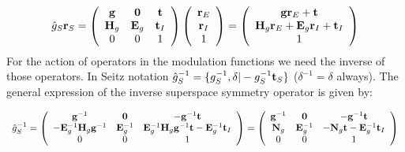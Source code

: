 \documentclass[10pt]{article}
\begin{document}
\begin{equation} \label{action_aug}
\begin{array} {l}
{\hat g}_S {\bf r}_S= \left( {\begin{array}{*{20}{c}}
	{\bf g}    &{\bf 0}    &{\bf t}\\
	{{\bf H}_g}&{{\bf E}_g}&{\bf t}_I\\
	{0}     &{0}        &{1}
	\end{array}} \right)  \left( {\begin{array}{*{15}{c}} {\bf r}_E \\ {\bf r}_I \\ {1} \end{array}} \right)=
\left( {\begin{array}{*{15}{c}} {\bf g} {\bf r}_E + {\bf t} \\ {\bf H}_g{\bf r}_E + {\bf E}_g{\bf r}_I + {\bf t}_I\\ {1} \end{array}} \right)
\end{array}
\end{equation}
For the action of operators in the modulation functions we need the inverse of those operators. In Seitz notation $\hat g_S^{-1}=\{g_S^{-1},\delta| -g_S^{-1}{\bf t}_S  \}$ ($\delta^{-1}=\delta$ always). The general expression of the inverse superspace symmetry operator is given by:


\begin{equation} \label{augmented_inversematrix}
\begin{array} {l}
{\hat g}_S^{-1} = \left( {\begin{array}{*{20}{c}}
	{\bf g}^{-1}                            &{\bf 0}        &	-{\bf g}^{-1}{\bf t}\\
	-{\bf E}_g^{-1}{\bf H}_g {\bf g}^{-1}   &{\bf E}_g^{-1}  & {\bf E}_g^{-1}{\bf H}_g	{\bf g}^{-1} {\bf t}- {\bf E}_g^{-1}{\bf t}_I\\
	{0}                                     &{0}            &{1}
	\end{array}} \right) = \left( {\begin{array}{*{20}{c}}
	{\bf g}^{-1}                            &{\bf 0}        &	-{\bf g}^{-1}{\bf t}\\
	{\bf N}_g  &{\bf E}_g^{-1}  & {-\bf N}_g {\bf t}- {\bf E}_g^{-1}{\bf t}_I\\
	{0}                                     &{0}            &{1}
	\end{array}} \right)
\end{array}
\end{equation}
\end{document}
